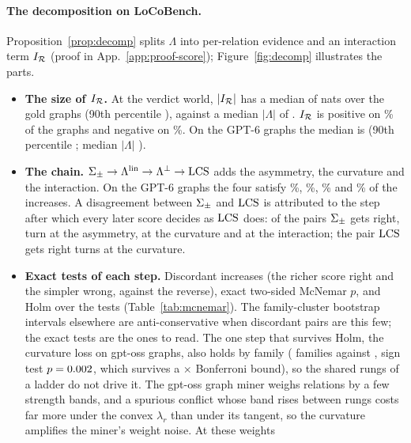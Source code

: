 \paragraph{The decomposition on LoCoBench.}
\label{app:decomp}
Proposition~\ref{prop:decomp} splits $\Lambda$ into per-relation evidence and an interaction term
$I_{\mathcal{R}}$ (proof in App.~\ref{app:proof-score}); Figure~\ref{fig:decomp} illustrates the parts.
\begin{itemize}[leftmargin=1.2em,itemsep=1pt,topsep=2pt]
\item \textbf{The size of $I_{\mathcal{R}}$.} At the verdict world, $|I_{\mathcal{R}}|$ has a median of
  \dcIGoldAbsMedian{} nats over the \dcIGoldN{} gold graphs (90th percentile \dcIGoldAbsPninety),
  against a median $|\Lambda|$ of \dcLamGoldAbsMedian. $I_{\mathcal{R}}$ is positive on \dcIGoldPos\% of the
  graphs and negative on \dcIGoldNeg\%. On the GPT-6 graphs the median is \dcIGptAbsMedian{}
  (90th percentile \dcIGptAbsPninety; median $|\Lambda|$ \dcLamGptAbsMedian).
\item \textbf{The chain.} $\Sigma_{\pm}\to\Lambda^{\mathrm{lin}}\to\Lambda^{\perp}\to\mathrm{LCS}$ adds the asymmetry, the curvature
  and the interaction. On the GPT-6 graphs the four satisfy \dcAttrWsum\%, \dcAttrLin\%,
  \dcAttrIndep\% and \dcAttrLcs\% of the \dcAttrPairs{} increases. A disagreement between $\Sigma_{\pm}$
  and $\mathrm{LCS}$ is attributed to the step after which every later score decides as $\mathrm{LCS}$ does: of
  the \dcAttrSumWins{} pairs $\Sigma_{\pm}$ gets right, \dcAttrSumWinsAsym{} turn at the asymmetry,
  \dcAttrSumWinsCurv{} at the curvature and \dcAttrSumWinsInter{} at the interaction; the
  \dcAttrLcsWins{} pair $\mathrm{LCS}$ gets right turns at the curvature.
\item \textbf{Exact tests of each step.} Discordant increases (the richer score right and the
  simpler wrong, against the reverse), exact two-sided McNemar $p$, and Holm over the
  \mcFamily{} tests (Table~\ref{tab:mcnemar}).
  The family-cluster bootstrap intervals elsewhere are anti-conservative when discordant pairs are
  this few; the exact tests are the ones to read. The one step that survives Holm, the curvature loss on
  gpt-oss graphs, also holds by family (\mcCurvOssFamB{} families against \mcCurvOssFamC, sign test
$p=0.002$, which survives a $\times$\mcFamily{} Bonferroni bound), so the shared rungs of a
ladder do not drive it. The gpt-oss graph miner weighs relations by a few strength bands, and a
  spurious conflict whose band rises between rungs costs far more under the convex $\lambda_r$ than
  under its tangent, so the curvature amplifies the miner's weight noise. At these weights

\end{itemize}
